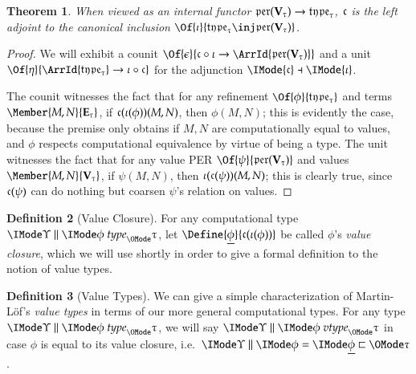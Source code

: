 \documentclass[11pt]{article}
\newtheorem{thm}{Theorem}[section]
\theoremstyle{definition}
\newtheorem{definition}[thm]{Definition}
\theoremstyle{notation}
\theoremstyle{remark}
\numberwithin{equation}{section}
\newcommand\Exprs{\mathbf{E}}
\newcommand\Values{\mathbf{V}}
\begin{document}
\begin{thm}
When viewed as an internal functor
$\PERs{\Values_\tau}\to\Types{\tau}$, $\mathfrak{c}$ is the left adjoint to
the canonical inclusion
$\Of{\iota}{\Types{\tau}\inj\PERs{\Values_\tau}}$.
\end{thm}
\begin{proof}
  We will exhibit a counit $\Of{\epsilon}{\VToCType\circ\iota\to
  \ArrId{\PERs{\Values_\tau}}}$ and a unit
  $\Of{\eta}{\ArrId{\Types{\tau}}\to\iota\circ\VToCType}$ for
  the adjunction $\IMode{\VToCType}\dashv\IMode{\iota}$.

  The counit witnesses the fact that for any refinement
  $\Of{\phi}{\Types{\tau}}$ and terms $\Member{M,N}{\Exprs_\tau}$, if
  $\mathfrak{c}(\iota(\phi))(M,N)$, then $\phi(M,N)$; this is evidently the case,
  because the premise only obtains if $M,N$ are computationally equal to
  values, and $\phi$ respects computational equivalence by virtue of being a
  type.  The unit witnesses the fact that for any value PER
  $\Of{\psi}{\PERs{\Values_\tau}}$ and values $\Member{M,N}{\Values_\tau}$, if
  $\psi(M,N)$, then $\iota(\mathfrak{c}(\psi))(M,N)$; this is clearly true, since
  $\mathfrak{c}(\psi)$ can do nothing but coarsen $\psi$'s relation on values.

\end{proof}

\begin{definition}[Value Closure]
  For any computational type $\IsType{\Upsilon}{\phi}{\tau}$, let
  $\Define{\underline{\phi}}{\VToCType(\iota(\phi))}$ be called $\phi$'s
  \emph{value closure}, which we will use shortly in order to give a formal
  definition to the notion of value types.
\end{definition}

\begin{definition}[Value Types]
  We can give a simple characterization of Martin-L\"of's \emph{value types} in
  terms of our more general computational types. For any type
  $\IsType{\Upsilon}{\phi}{\tau}$, we will say
  $\IsValueType{\Upsilon}{\phi}{\tau}$ in case $\phi$ is equal to its value
  closure, i.e.\ $\EqRefines{\Upsilon}{\phi}{\underline{\phi}}{\tau}$.
\end{definition}

\ifdraft{}{
  \newpage
  \nocite{maclane:1971}
  
  
}
\end{document}
